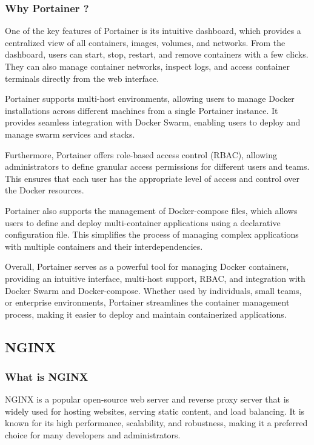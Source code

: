 \documentclass[
12pt,
oneside, 
onehalfspacing, 
nolistspacing, 
parskip, 
chapterinoneline, 
]{AASTCOMPUTER}
\begin{document}
\subsubsection{Why Portainer ?}

One of the key features of Portainer is its intuitive dashboard, which provides a centralized view of all containers, images, volumes, and networks. From the dashboard, users can start, stop, restart, and remove containers with a few clicks. They can also manage container networks, inspect logs, and access container terminals directly from the web interface.

Portainer supports multi-host environments, allowing users to manage Docker installations across different machines from a single Portainer instance. It provides seamless integration with Docker Swarm, enabling users to deploy and manage swarm services and stacks.

Furthermore, Portainer offers role-based access control (RBAC), allowing administrators to define granular access permissions for different users and teams. This ensures that each user has the appropriate level of access and control over the Docker resources.

Portainer also supports the management of Docker-compose files, which allows users to define and deploy multi-container applications using a declarative configuration file. This simplifies the process of managing complex applications with multiple containers and their interdependencies.

Overall, Portainer serves as a powerful tool for managing Docker containers, providing an intuitive interface, multi-host support, RBAC, and integration with Docker Swarm and Docker-compose. Whether used by individuals, small teams, or enterprise environments, Portainer streamlines the container management process, making it easier to deploy and maintain containerized applications.

\subsection{NGINX}
\subsubsection{What is NGINX}

NGINX is a popular open-source web server and reverse proxy server that is widely used for hosting websites, serving static content, and load balancing. It is known for its high performance, scalability, and robustness, making it a preferred choice for many developers and administrators.
\end{document}
